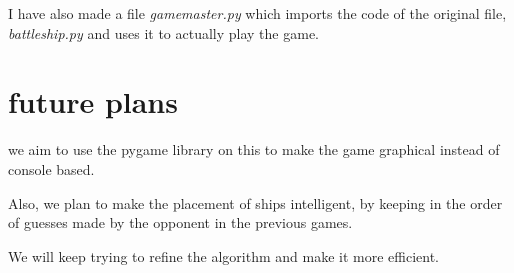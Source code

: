 \documentclass{article}
\begin{document}
	I have also made a file \textit{gamemaster.py} which imports the code of the original file, \textit{battleship.py} and uses it to actually play the game.
   
   \section{future plans}
   we aim to use the pygame library on this to make the game graphical instead of console based.
  
  Also, we plan to make the placement of ships intelligent, by keeping in the order of guesses made by the opponent in the previous games.
  
  We will keep trying to refine the algorithm and make it more efficient.
\end{document}

